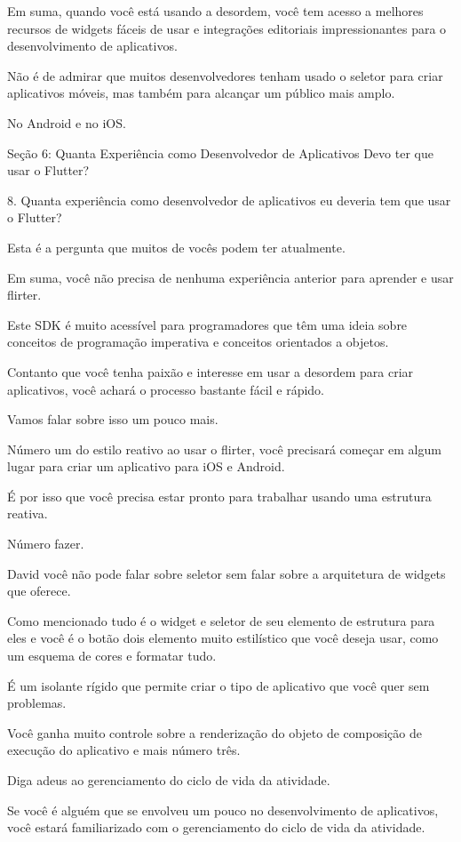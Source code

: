 Em suma, quando você está usando a desordem, você tem acesso a melhores recursos de widgets fáceis de usar e integrações editoriais impressionantes para o desenvolvimento de aplicativos.

Não é de admirar que muitos desenvolvedores tenham usado o seletor para criar aplicativos móveis, mas também para alcançar um público mais amplo.

No Android e no iOS.

Seção 6: Quanta Experiência como Desenvolvedor de Aplicativos
Devo ter que usar o Flutter?

8. Quanta experiência como desenvolvedor de aplicativos eu deveria
tem que usar o Flutter?

Esta é a pergunta que muitos de vocês podem ter atualmente.

Em suma, você não precisa de nenhuma experiência anterior para aprender e usar flirter.

Este SDK é muito acessível para programadores que têm uma ideia sobre conceitos de programação imperativa e conceitos orientados a objetos.

Contanto que você tenha paixão e interesse em usar a desordem para criar aplicativos, você achará o processo bastante fácil e rápido.

Vamos falar sobre isso um pouco mais.

Número um do estilo reativo ao usar o flirter, você precisará começar em algum lugar para criar um aplicativo para iOS e Android.

É por isso que você precisa estar pronto para trabalhar usando uma estrutura reativa.

Número fazer.

David você não pode falar sobre seletor sem falar sobre a arquitetura de widgets que oferece.

Como mencionado tudo é o widget e seletor de seu elemento de estrutura para eles e você é o botão dois elemento muito estilístico que você deseja usar, como um esquema de cores e formatar tudo.

É um isolante rígido que permite criar o tipo de aplicativo que você quer sem problemas.

Você ganha muito controle sobre a renderização do objeto de composição de execução do aplicativo e mais número três.

Diga adeus ao gerenciamento do ciclo de vida da atividade.

Se você é alguém que se envolveu um pouco no desenvolvimento de aplicativos, você estará familiarizado com o gerenciamento do ciclo de vida da atividade.

